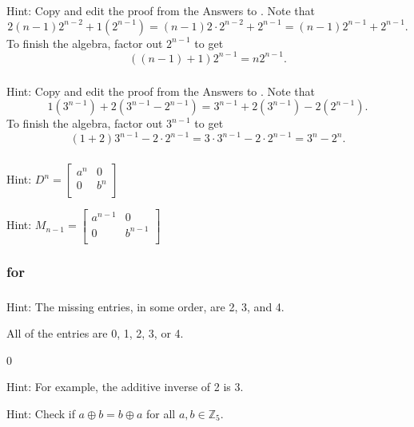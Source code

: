 \subsubsection*{ \answers} 
Hint: Copy and edit the proof from the Answers to . Note that $$2(n-1)2^{n-2}+1(2^{n-1})=(n-1)2\cdot 2^{n-2} + 2^{n-1}=(n-1)2^{n-1} + 2^{n-1}.$$  To finish the algebra, factor out $2^{n-1}$ to get $$((n-1)+1)2^{n-1} =n2^{n-1}.$$

\subsubsection*{ \answers} 
Hint: Copy and edit the proof from the Answers to . Note that $$1(3^{n-1})+2(3^{n-1}-2^{n-1})=3^{n-1}+2(3^{n-1}) -2(2^{n-1}).$$  To finish the algebra, factor out $3^{n-1}$ to get $$(1+2)3^{n-1}-2\cdot 2^{n-1} =3\cdot 3^{n-1}-2\cdot 2^{n-1}=3^n-2^n.$$

\subsubsection*{ \answers}
\begin{apart}
    \item Hint: $D^n =\left[ \begin{array}{cc} a^n & 0 \\ 0 & b^n \\ \end{array} \right]$
    \item Hint: $M_{n-1}=\left[ \begin{array}{cc} a^{n-1} & 0 \\ 0 & b^{n-1} \\ \end{array} \right]$ 
\end{apart}

\subsubsection{\answers for 
\subgroups}

\subsubsection*{ \answers}
\begin{apart}
    \item Hint: The missing entries, in some order, are 2, 3, and 4.
    \item All of the entries are 0, 1, 2, 3, or 4.
    \item 0
    \item Hint: For example, the additive inverse of 2 is 3.
    \item Hint: Check if $a \oplus b = b \oplus a$ for all $a, b \in \mathbb{Z}_5$.
\end{apart}

